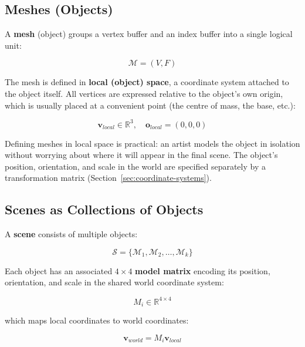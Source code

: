 \documentclass[11pt]{article}
\begin{document}
\subsection{Meshes (Objects)}

A \textbf{mesh} (object) groups a vertex buffer and an index buffer into a single logical unit:

\begin{equation}
    \mathcal{M} = (V, F)
\end{equation}

The mesh is defined in \textbf{local (object) space}, a coordinate system attached to the object itself. All vertices are expressed relative to the object's own origin, which is usually placed at a convenient point (the centre of mass, the base, etc.):

\begin{equation}
    \mathbf{v}_{local} \in \mathbb{R}^3, \quad \mathbf{o}_{local} = (0,0,0)
\end{equation}

Defining meshes in local space is practical: an artist models the object in isolation without worrying about where it will appear in the final scene. The object's position, orientation, and scale in the world are specified separately by a transformation matrix (Section~\ref{sec:coordinate-systems}).


\subsection{Scenes as Collections of Objects}

A \textbf{scene} consists of multiple objects:

\begin{equation}
    \mathcal{S} = \{\mathcal{M}_1, \mathcal{M}_2, \dots, \mathcal{M}_k\}
\end{equation}

Each object has an associated $4 \times 4$ \textbf{model matrix} encoding its position, orientation, and scale in the shared world coordinate system:

\begin{equation}
    M_i \in \mathbb{R}^{4 \times 4}
\end{equation}

which maps local coordinates to world coordinates:

\begin{equation}
    \mathbf{v}_{world} = M_i \mathbf{v}_{local}
\end{equation}
\end{document}
